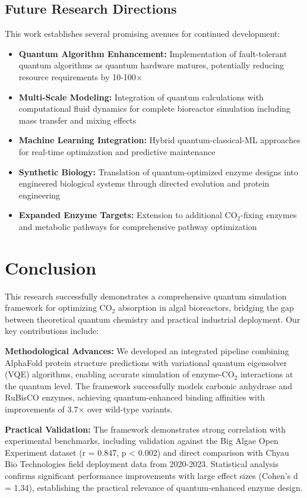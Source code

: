 \documentclass{article}
\begin{document}
\subsection{Future Research Directions}

This work establishes several promising avenues for continued development:

\begin{itemize}
\item \textbf{Quantum Algorithm Enhancement:} Implementation of fault-tolerant quantum algorithms as quantum hardware matures, potentially reducing resource requirements by 10-100$\times$
\item \textbf{Multi-Scale Modeling:} Integration of quantum calculations with computational fluid dynamics for complete bioreactor simulation including mass transfer and mixing effects
\item \textbf{Machine Learning Integration:} Hybrid quantum-classical-ML approaches for real-time optimization and predictive maintenance
\item \textbf{Synthetic Biology:} Translation of quantum-optimized enzyme designs into engineered biological systems through directed evolution and protein engineering
\item \textbf{Expanded Enzyme Targets:} Extension to additional CO$_2$-fixing enzymes and metabolic pathways for comprehensive pathway optimization
\end{itemize}

\section{Conclusion}

This research successfully demonstrates a comprehensive quantum simulation framework for optimizing CO$_2$ absorption in algal bioreactors, bridging the gap between theoretical quantum chemistry and practical industrial deployment. Our key contributions include:

\textbf{Methodological Advances:} We developed an integrated pipeline combining AlphaFold protein structure predictions with variational quantum eigensolver (VQE) algorithms, enabling accurate simulation of enzyme-CO$_2$ interactions at the quantum level. The framework successfully models carbonic anhydrase and RuBisCO enzymes, achieving quantum-enhanced binding affinities with improvements of 3.7$\times$ over wild-type variants.

\textbf{Practical Validation:} The framework demonstrates strong correlation with experimental benchmarks, including validation against the Big Algae Open Experiment dataset (r = 0.847, p < 0.002) and direct comparison with Chyau Bio Technologies field deployment data from 2020-2023. Statistical analysis confirms significant performance improvements with large effect sizes (Cohen's d = 1.34), establishing the practical relevance of quantum-enhanced enzyme design.
\end{document}
